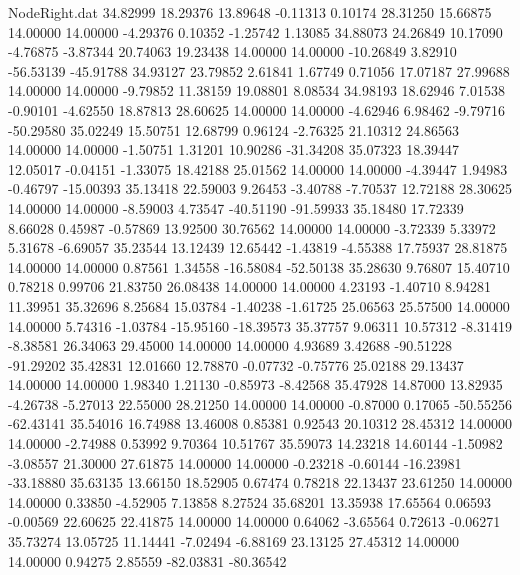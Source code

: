 \begin{filecontents}{NodeRight.dat}
  34.82999   18.29376   13.89648    -0.11313    0.10174   28.31250   15.66875   14.00000   14.00000   -4.29376    0.10352   -1.25742    1.13085
  34.88073   24.26849   10.17090    -4.76875   -3.87344   20.74063   19.23438   14.00000   14.00000  -10.26849    3.82910  -56.53139  -45.91788
  34.93127   23.79852    2.61841     1.67749    0.71056   17.07187   27.99688   14.00000   14.00000   -9.79852   11.38159   19.08801    8.08534
  34.98193   18.62946    7.01538    -0.90101   -4.62550   18.87813   28.60625   14.00000   14.00000   -4.62946    6.98462   -9.79716  -50.29580
  35.02249   15.50751   12.68799     0.96124   -2.76325   21.10312   24.86563   14.00000   14.00000   -1.50751    1.31201   10.90286  -31.34208
  35.07323   18.39447   12.05017    -0.04151   -1.33075   18.42188   25.01562   14.00000   14.00000   -4.39447    1.94983   -0.46797  -15.00393
  35.13418   22.59003    9.26453    -3.40788   -7.70537   12.72188   28.30625   14.00000   14.00000   -8.59003    4.73547  -40.51190  -91.59933
  35.18480   17.72339    8.66028     0.45987   -0.57869   13.92500   30.76562   14.00000   14.00000   -3.72339    5.33972    5.31678   -6.69057
  35.23544   13.12439   12.65442    -1.43819   -4.55388   17.75937   28.81875   14.00000   14.00000    0.87561    1.34558  -16.58084  -52.50138
  35.28630    9.76807   15.40710     0.78218    0.99706   21.83750   26.08438   14.00000   14.00000    4.23193   -1.40710    8.94281   11.39951
  35.32696    8.25684   15.03784    -1.40238   -1.61725   25.06563   25.57500   14.00000   14.00000    5.74316   -1.03784  -15.95160  -18.39573
  35.37757    9.06311   10.57312    -8.31419   -8.38581   26.34063   29.45000   14.00000   14.00000    4.93689    3.42688  -90.51228  -91.29202
  35.42831   12.01660   12.78870    -0.07732   -0.75776   25.02188   29.13437   14.00000   14.00000    1.98340    1.21130   -0.85973   -8.42568
  35.47928   14.87000   13.82935    -4.26738   -5.27013   22.55000   28.21250   14.00000   14.00000   -0.87000    0.17065  -50.55256  -62.43141
  35.54016   16.74988   13.46008     0.85381    0.92543   20.10312   28.45312   14.00000   14.00000   -2.74988    0.53992    9.70364   10.51767
  35.59073   14.23218   14.60144    -1.50982   -3.08557   21.30000   27.61875   14.00000   14.00000   -0.23218   -0.60144  -16.23981  -33.18880
  35.63135   13.66150   18.52905     0.67474    0.78218   22.13437   23.61250   14.00000   14.00000    0.33850   -4.52905    7.13858    8.27524
  35.68201   13.35938   17.65564     0.06593   -0.00569   22.60625   22.41875   14.00000   14.00000    0.64062   -3.65564    0.72613   -0.06271
  35.73274   13.05725   11.14441    -7.02494   -6.88169   23.13125   27.45312   14.00000   14.00000    0.94275    2.85559  -82.03831  -80.36542

\end{filecontents}

